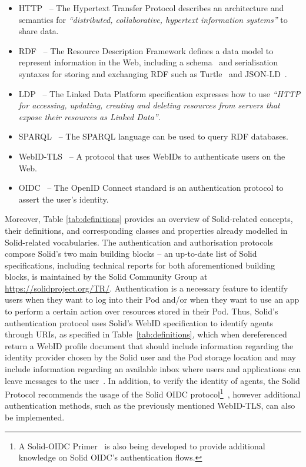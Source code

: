 \begin{itemize}
    \item HTTP~\citep{fielding_http_2022} -- The Hypertext Transfer Protocol describes an architecture and semantics for \textit{``distributed, collaborative, hypertext information systems''} to share data.
    \item RDF~\citep{cyganiak_rdf_2014} -- The Resource Description Framework defines a data model to represent information in the Web, including a schema~\citep{brickley_rdf_2014} and serialisation syntaxes for storing and exchanging RDF such as Turtle~\citep{prudhommeaux_rdf_2014} and JSON-LD~\citep{gregg_kellogg_json-ld_2020}.
    \item LDP~\citep{speicher_linked_2015} -- The Linked Data Platform specification expresses how to use \textit{``HTTP for accessing, updating, creating and deleting resources from servers that expose their resources as Linked Data''}.
    \item SPARQL~\citep{harris_sparql_2013} -- The SPARQL language can be used to query RDF databases. %
    \item WebID-TLS~\citep{story_webid-tls_2014} -- A protocol that uses WebIDs to authenticate users on the Web.
    \item OIDC~\citep{sakimura_openid_2014} -- The OpenID Connect standard is an authentication protocol to assert the user's identity. 
\end{itemize}

Moreover, Table \ref{tab:definitions} provides an overview of Solid-related concepts, their definitions, and corresponding classes and properties already modelled in Solid-related vocabularies.
The authentication and authorisation protocols compose Solid's two main building blocks -- an up-to-date list of Solid specifications, including technical reports for both aforementioned building blocks, is maintained by the Solid Community Group at \url{https://solidproject.org/TR/}.
Authentication is a necessary feature to identify users when they want to log into their Pod and/or when they want to use an app to perform a certain action over resources stored in their Pod.
Thus, Solid's authentication protocol uses Solid's WebID specification to identify agents through URIs, as specified in Table~\ref{tab:definitions}, which when dereferenced return a WebID profile document that should include information regarding the identity provider chosen by the Solid user and the Pod storage location and may include information regarding an available inbox where users and applications can leave messages to the user~\citep{balseiro_solid_2022}.
In addition, to verify the identity of agents, the Solid Protocol recommends the usage of the Solid OIDC protocol\footnote{A Solid-OIDC Primer~\citep{morgan_oidcprimer_2022} is also being developed to provide additional knowledge on Solid OIDC's authentication flows.}~\citep{coburn_oidc_2022}, however additional authentication methods, such as the previously mentioned WebID-TLS, can also be implemented.

